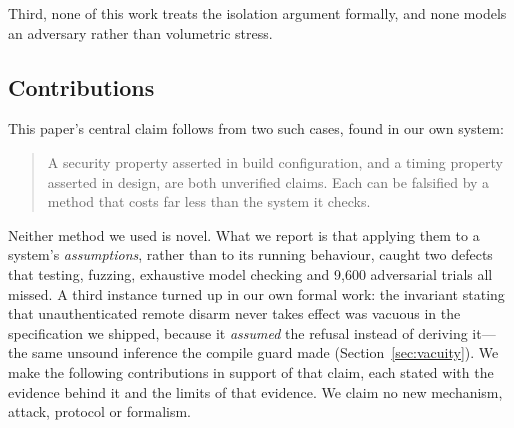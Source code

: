 Third, none of this work treats the isolation argument formally, and none models an adversary
rather than volumetric stress.

\subsection{Contributions}

This paper's central claim follows from two such cases, found in our own system:

\begin{quote}
A security property asserted in build configuration, and a timing property asserted in design,
are both unverified claims. Each can be falsified by a method that costs far less than the
system it checks.
\end{quote}

Neither method we used is novel. What we report is that applying them to a system's
\emph{assumptions}, rather than to its running behaviour, caught two defects that testing,
fuzzing, exhaustive model checking and 9{,}600 adversarial trials all missed. A third instance
turned up in our own formal work: the invariant stating that unauthenticated remote disarm
never takes effect was vacuous in the specification we shipped, because it \emph{assumed} the
refusal instead of deriving it---the same unsound inference the compile guard made
(Section~\ref{sec:vacuity}). We make the
following contributions in support of that claim, each stated with the evidence behind it and
the limits of that evidence. We claim no new mechanism, attack, protocol or formalism.

